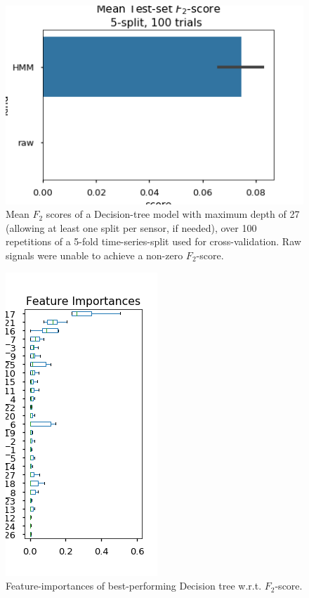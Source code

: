 \documentclass[twocolumn,10pt]{article}
\begin{document}
\begin{figure}
    \centering
    \includegraphics[width=\linewidth]{img/tree_fscores.png}
    \caption{Mean $F_2$ scores of a Decision-tree model with maximum depth of 27 (allowing at least one split per sensor, if needed), over 100 repetitions of a 5-fold time-series-split used for cross-validation. Raw signals were unable to achieve a non-zero $F_2$-score. }
    \label{fig:tree_fscores}
\end{figure}

\begin{figure}
    \centering
    \includegraphics[width=.7\linewidth]{img/tree_imp.png}
    \caption{Feature-importances of best-performing Decision tree w.r.t. $F_2$-score. }
    \label{fig:tree_importances. }
\end{figure}
\end{document}
